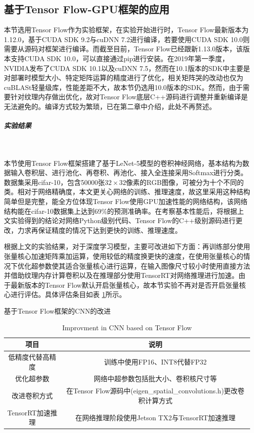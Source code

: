 \subsection{基于Tensor Flow-GPU框架的应用}
\par 本节选用Tensor Flow作为实验框架，在实验开始进行时，Tensor Flow最新版本为1.12.0，基于CUDA SDK 9.2与cuDNN 7.2进行编译，若要使用CUDA SDK 10.0则需要从源码对框架进行编译。而截至目前，Tensor Flow已经跟新1.13.0版本，该版本支持CUDA SDK 10.0，可以直接通过pip进行安装。在2019年第一季度，NVIDIA发布了CUDA SDK 10.1以及cuDNN 7.5，然而在10.1版本的SDK中主要是对部署时模型大小、特定矩阵运算的精度进行了优化，相关矩阵哭的改动也仅为cuBLASt轻量级库，性能差距不大，故本节仍选用10.0版本的SDK。然而，由于需要针对纹理内存做出优化，故对Tensor Flow底层C++源码进行调整并重新编译是无法避免的。编译方式较为繁琐，已在第二章中介绍，此处不再赘述。
\subparagraph{实验结果}~{}
\par 本节使用Tensor Flow框架搭建了基于LeNet-5模型的卷积神经网络，基本结构为数据输入卷积层、进行池化、再卷积、再池化、接入全连接采用Softmax进行分类。数据集采用cifar-10，包含50000张$ 32 \times 32 $像素的RGB图像，可被分为十个不同的类。相对于网络精确度，本文更关心网络的训练、推理速度，故这里采用这种结构简单但是完整，能全方位体现Tensor Flow使用GPU加速性能的网络结构，该网络结构能在cifar-10数据集上达到69\%的预测准确率。在考察基本性能后，将根据上文实验得到的结论对网络Python级别代码、Tensor Flow的C++级别源码进行更改，力求再保证精度的情况下达到更快的训练、推理速度。
\par 根据上文的实验结果，对于深度学习模型，主要可改进如下方面：再训练部分使用张量核心加速矩阵乘加运算，使用较低的精度换更快的速度，在使用张量核心的情况下优化超参数使其适合张量核心进行运算，在输入图像尺寸较小时使用直接方法并借助纹理内存计算卷积以及在推理部分使用TensorRT对网络推理进行加速。由于最新版本的Tensor Flow默认开启张量核心，故本节实验不再对是否开启张量核心进行评估。具体评估条目如表 \ref{table-TFList}所示。
\begin{table}
	\centering
	\renewcommand{\thetable}{\arabic{section}-\arabic{table} }
	\renewcommand{\tablename}{表}
	\caption{基于Tensor Flow框架的CNN的改进}
	\addtocounter{table}{-1}
	\renewcommand{\thetable}{\arabic{section}-\arabic{table} }
	\renewcommand{\tablename}{Table}
	\caption{Improvment in CNN based on Tensor Flow}
	\begin{tabular}{cc}
		\toprule
		项目 & 说明\\
		\midrule
		低精度代替高精度 & 训练中使用FP16、INT8代替FP32\\
		优化超参数 & 网络中超参数包括批大小、卷积核尺寸等\\
		改进卷积方式 & 在Tensor Flow源码中(eigen\_spatial\_convolutions.h)更改卷积计算方式\\
		TensorRT加速推理 & 在网络推理阶段使用Jetson TX2与TensorRT加速推理\\
		\bottomrule
	\end{tabular} \label{table-TFList} 
\end{table}
